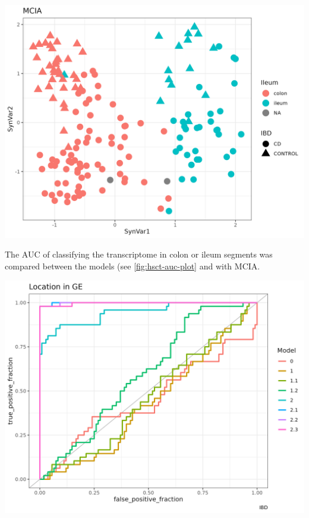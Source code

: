 \documentclass[
  12pt,
  a4paper,
  twoside,
  openright]{book}
\let\origfigure\figure
\let\endorigfigure\endfigure
\renewenvironment{figure}[1][2] {
    \expandafter\origfigure\expandafter[!ht]
} {
    \endorigfigure
}
\begin{document}
\begin{figure}
\includegraphics[width=1\linewidth]{images/hsct-mcia} \caption[MCIA on the HSCT dataset]{MCIA first two synthetic variables on IBD related cohorts. In red circles the colon and in blue triangles the ileum.}\label{fig:hsct-mcia}
\end{figure}

The AUC of classifying the transcriptome in colon or ileum segments was compared between the models (see \ref{fig:hsct-auc-plot} and with MCIA.

\begin{figure}
\includegraphics[width=1\linewidth]{images/hsct-auc-models} \caption[ROC curves of the RGCCA models on the HSCT dataset.]{ROC curve of the different datasets with the models from RGCCA on the HSCT dataset.}\label{fig:hsct-auc-plot}
\end{figure}
\end{document}
